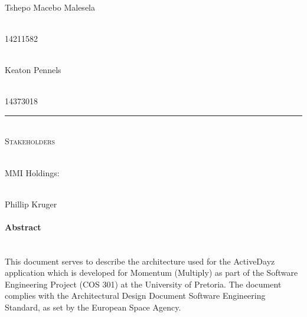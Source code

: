 \documentclass[11pt]{article}
\begin{document}
\begin{titlepage}
\begin{center}
		\begin{minipage}{0.4\textwidth}
			\begin{flushleft} \large
				\emph{} \\
				Tshepo Macebo {Malesela}
			\end{flushleft}
		\end{minipage}
		\begin{minipage}{0.4\textwidth}
			\begin{flushright} \large
				\emph{} \\
				14211582
			\end{flushright}
		\end{minipage}

        \begin{minipage}{0.4\textwidth}
			\begin{flushleft} \large
				\emph{} \\
				Keaton {Pennels}
			\end{flushleft}
		\end{minipage}
		\begin{minipage}{0.4\textwidth}
			\begin{flushright} \large
				\emph{} \\
				14373018
			\end{flushright}
		\end{minipage}

		\rule{\linewidth}{0.5mm} \\[1cm]
		\textsc{\Large Stakeholders}\\[1cm]

		\begin{minipage}{0.4\textwidth}
			\begin{flushleft} \large
				\emph{} \\
				MMI Holdings:
			\end{flushleft}
		\end{minipage}
		\begin{minipage}{0.4\textwidth}
			\begin{flushright} \large
				\emph{} \\
				Phillip Kruger
			\end{flushright}
		\end{minipage}


	\end{center}
\end{titlepage}

\newpage
\paragraph{Abstract}\mbox{}\\
This document serves to describe the architecture used for the ActiveDayz application which is developed for Momentum (Multiply) as part of the Software Engineering Project (COS 301) at the University of Pretoria.\newline
The document complies with the Architectural Design Document Software Engineering Standard, as set by the European Space Agency.
\end{document}
